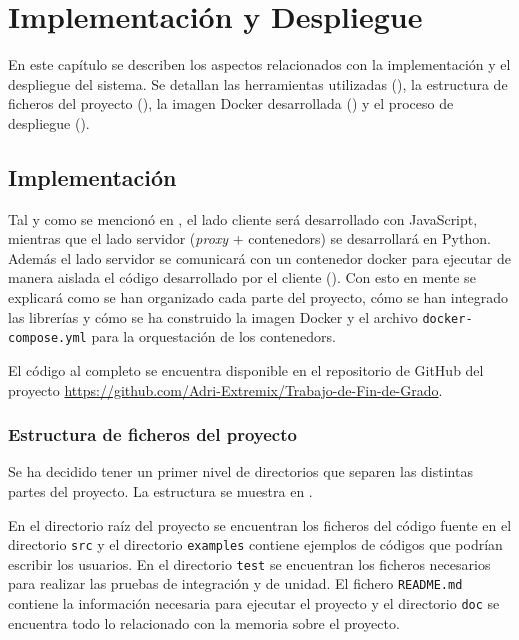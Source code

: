 \chapter{Implementación y Despliegue}\label{chap:implementacion_y_despliegue}
En este capítulo se describen los aspectos relacionados con la implementación y el despliegue del sistema. Se detallan las herramientas utilizadas (), la estructura de ficheros del proyecto (), la \gls{imagen Docker} desarrollada () y el proceso de despliegue ().

\section{Implementación} \label{sec:implementacion}
Tal y como se mencionó en , el lado cliente será desarrollado con JavaScript, mientras que el lado servidor (\textit{\gls{proxy}} + \glspl{contenedor}) se desarrollará en Python. Además el lado servidor se comunicará con un \gls{contenedor} docker para ejecutar de manera aislada el código desarrollado por el cliente (). Con esto en mente se explicará como se han organizado cada parte del proyecto, cómo se han integrado las librerías y cómo se ha construido la \gls{imagen Docker} y el archivo \texttt{docker-compose.yml} para la orquestación de los \glspl{contenedor}.

El código al completo se encuentra disponible en el repositorio de GitHub del proyecto \url{https://github.com/Adri-Extremix/Trabajo-de-Fin-de-Grado}.

\subsection{Estructura de ficheros del proyecto}\label{subsec:estructura_ficheros_proyecto}

Se ha decidido tener un primer nivel de directorios que separen las distintas partes del proyecto. La estructura se muestra en .   
\begin{figure}[H]
    {
    \begin{tcolorbox}
    \end{tcolorbox}
    }
\end{figure}
En el directorio raíz del proyecto se encuentran los ficheros del \gls{código fuente} en el directorio \texttt{src} y el directorio \texttt{examples} contiene ejemplos de códigos que podrían escribir los usuarios. En el directorio \texttt{test} se encuentran los ficheros necesarios para realizar las pruebas de integración y de unidad. El fichero \texttt{README.md} contiene la información necesaria para ejecutar el proyecto y el directorio \texttt{doc} se encuentra todo lo relacionado con la memoria sobre el proyecto.


